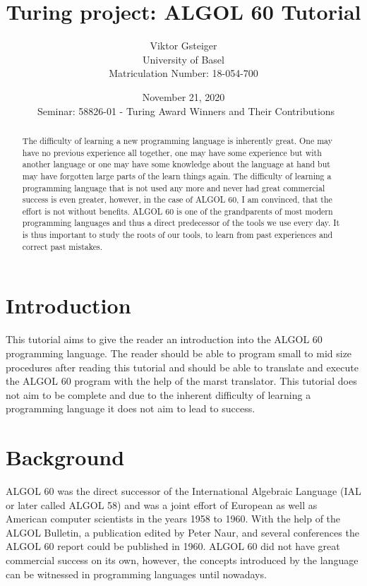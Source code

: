 \documentclass{article}
\author{Viktor Gsteiger \\ University of Basel \\ Matriculation Number: 18-054-700}
\title{Turing project: ALGOL 60 Tutorial}
\date{November 21, 2020 \\\ Seminar: 58826-01 - Turing Award Winners and Their Contributions}
\begin{document}
\maketitle

\begin{abstract}
	The difficulty of learning a new programming language is inherently great. One may have no previous experience all together, one may have some experience but with another language or one may have some knowledge about the language at hand but may have forgotten large parts of the learn things again. The difficulty of learning a programming language that is not used any more and never had great commercial success is even greater, however, in the case of ALGOL 60, I am convinced, that the effort is not without benefits. ALGOL 60 is one of the grandparents of most modern programming languages and thus a direct predecessor of the tools we use every day. It is thus important to study the roots of our tools, to learn from past experiences and correct past mistakes.
\end{abstract}

\newpage

\tableofcontents

\newpage

\section{Introduction}
This tutorial aims to give the reader an introduction into the ALGOL 60 programming language. The reader should be able to program small to mid size procedures after reading this tutorial and should be able to translate and execute the ALGOL 60 program with the help of the marst translator. This tutorial does not aim to be complete and due to the inherent difficulty of learning a programming language it does not aim to lead to success.

\section{Background}
ALGOL 60 was the direct successor of the International Algebraic Language (IAL or later called ALGOL 58) and was a joint effort of European as well as American computer scientists in the years 1958 to 1960. With the help of the ALGOL Bulletin, a publication edited by Peter Naur, and several conferences the ALGOL 60 report could be published in 1960. ALGOL 60 did not have great commercial success on its own, however, the concepts introduced by the language can be witnessed in programming languages until nowadays.
\end{document}
